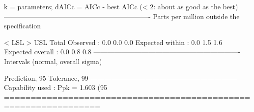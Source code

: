 \documentclass[a4paper,11pt,oneside,openany,parskip=half-,headings=standardclasses,toc=flat,numbers=noenddot]{scrbook}
\begin{document}
\begin{outbox}
  k = parameters; dAICc = AICc - best AICc (< 2: about as good as the best)
----------------------------------------------------------------
  Parts per million outside the specification

                              < LSL       > USL       Total
            Observed :          0.0         0.0         0.0
     Expected within :          0.0         1.5         1.6
    Expected overall :          0.0         0.8         0.8
----------------------------------------------------------------
  Intervals (normal, overall sigma)

     Prediction, 95%
  Tolerance, 99%
----------------------------------------------------------------
     Capability used : Ppk = 1.603   (95%
================================================================
\end{outbox}
\end{document}
